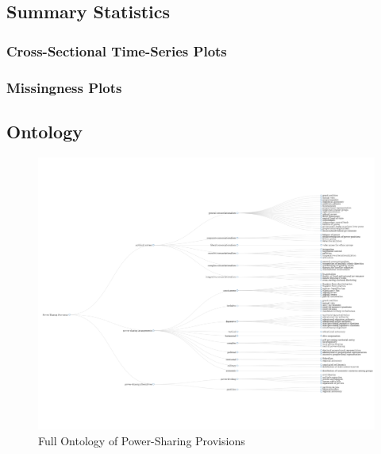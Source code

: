 \documentclass[12pt]{article}
\begin{document}
\subsection{Summary Statistics}
\subsubsection{Cross-Sectional Time-Series Plots}
\subsubsection{Missingness Plots}

\subsection{Ontology}
\begin{figure}
	\includegraphics[width = 9.5in]{psp_ontology_vis.png}
	\caption{Full Ontology of Power-Sharing Provisions}
\end{figure}
\end{document}
